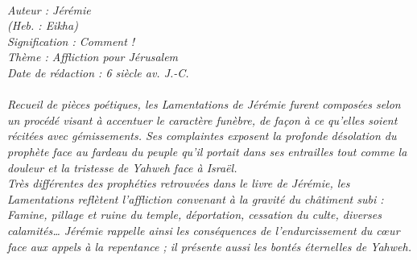 \BFont
\noindent\hrulefill
{\footnotesize
\textit{
\bigskip
{\centering{}
\\Auteur : Jérémie
\\(Heb. : Eikha)
\\Signification : Comment !
\\Thème : Affliction pour Jérusalem
\\Date de rédaction : 6 siècle av. J.-C.\\}
}
\textit{
\\Recueil de pièces poétiques, les Lamentations de Jérémie furent composées selon un procédé visant à accentuer le caractère funèbre, de façon à ce qu'elles soient récitées avec gémissements. Ses complaintes exposent la profonde désolation du prophète face au fardeau du peuple qu'il portait dans ses entrailles tout comme la douleur et la tristesse de Yahweh face à Israël.
\\Très différentes des prophéties retrouvées dans le livre de Jérémie, les Lamentations reflètent l'affliction convenant à la gravité du châtiment subi : Famine, pillage et ruine du temple, déportation, cessation du culte, diverses calamités… Jérémie rappelle ainsi les conséquences de l'endurcissement du cœur face aux appels à la repentance ; il présente aussi les bontés éternelles de Yahweh.\bigskip
}
}
\par\nobreak\noindent\hrulefill
